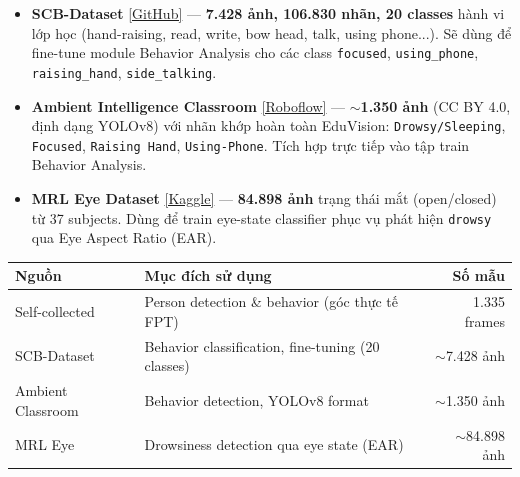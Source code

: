 \documentclass[a4paper,10pt]{article}
\begin{document}
\begin{itemize}[noitemsep, topsep=1pt]
    \item \textbf{SCB-Dataset} \href{https://github.com/Whiffe/SCB-dataset}{[GitHub]} --- \textbf{7.428 ảnh, 106.830 nhãn, 20 classes} hành vi lớp học (hand-raising, read, write, bow head, talk, using phone...). Sẽ dùng để fine-tune module Behavior Analysis cho các class \texttt{focused}, \texttt{using\_phone}, \texttt{raising\_hand}, \texttt{side\_talking}.

    \item \textbf{Ambient Intelligence Classroom} \href{https://universe.roboflow.com/national-taipei-university-of-technology-jc4sl/ambient-intelligence-classroom}{[Roboflow]} --- \textbf{$\sim$1.350 ảnh} (CC BY 4.0, định dạng YOLOv8) với nhãn khớp hoàn toàn EduVision: \texttt{Drowsy/Sleeping}, \texttt{Focused}, \texttt{Raising Hand}, \texttt{Using-Phone}. Tích hợp trực tiếp vào tập train Behavior Analysis.

    \item \textbf{MRL Eye Dataset} \href{https://www.kaggle.com/datasets/akashshingha850/mrl-eye-dataset}{[Kaggle]} --- \textbf{84.898 ảnh} trạng thái mắt (open/closed) từ 37 subjects. Dùng để train eye-state classifier phục vụ phát hiện \texttt{drowsy} qua Eye Aspect Ratio (EAR).
\end{itemize}

\vspace{0.1cm}
\begin{center}
\begin{tabularx}{0.96\textwidth}{lXr}
\toprule
\textbf{Nguồn} & \textbf{Mục đích sử dụng} & \textbf{Số mẫu} \\
\midrule
Self-collected   & Person detection \& behavior (góc thực tế FPT)           & 1.335 frames \\
SCB-Dataset      & Behavior classification, fine-tuning (20 classes)         & $\sim$7.428 ảnh \\
Ambient Classroom & Behavior detection, YOLOv8 format                        & $\sim$1.350 ảnh \\
MRL Eye          & Drowsiness detection qua eye state (EAR)                  & $\sim$84.898 ảnh \\
\bottomrule
\end{tabularx}
\end{center}
\end{document}
